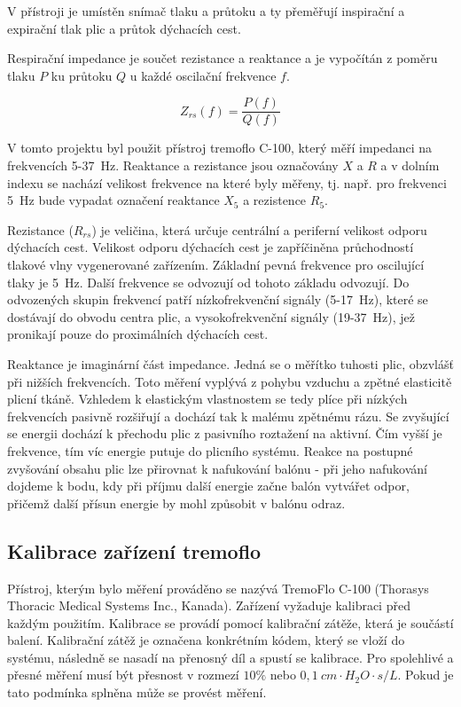 V přístroji je umístěn snímač tlaku a průtoku a ty přeměřují inspirační a expirační tlak plic a průtok dýchacích cest. 

Respirační impedance je součet rezistance a reaktance a je vypočítán z poměru tlaku  $P$ ku průtoku $Q$ u každé oscilační frekvence $f$. \cite{Vlcek2018}

\begin{equation}
	\label{rce:2}
	Z_{rs}(f) = \frac{P(f)}{Q(f)}
\end{equation}


V tomto projektu byl použit přístroj tremoflo C-100, který měří impedanci na frekvencích 5-37~Hz. Reaktance a rezistance jsou označovány $X$ a $R$ a v dolním indexu se nachází velikost frekvence na které byly měřeny, tj. např. pro frekvenci 5~Hz bude vypadat označení reaktance $X_5$ a rezistence $R_5$. 

Rezistance ($R_{rs}$) je veličina, která určuje centrální a periferní velikost odporu dýchacích cest. Velikost odporu dýchacích cest je zapříčiněna průchodností tlakové vlny vygenerované zařízením. Základní pevná frekvence pro oscilující tlaky je 5~Hz. Další frekvence se odvozují od tohoto základu odvozují. Do odvozených skupin frekvencí patří nízkofrekvenční signály (5-17~Hz), které se dostávají do obvodu centra plic, a vysokofrekvenční signály (19-37~Hz), jež pronikají pouze do proximálních dýchacích cest. 

Reaktance je imaginární část impedance. Jedná se o měřítko tuhosti plic, obzvlášť při nižších frekvencích. Toto měření vyplývá z pohybu vzduchu  a zpětné elasticitě plicní tkáně. Vzhledem k elastickým vlastnostem se tedy plíce při nízkých frekvencích pasivně rozšiřují a dochází tak k malému zpětnému rázu. Se zvyšující se energii dochází k přechodu plic z pasivního roztažení na aktivní. Čím vyšší je frekvence, tím víc energie putuje do plicního systému. Reakce na postupné zvyšování obsahu plic lze přirovnat k nafukování balónu - při jeho nafukování dojdeme k bodu, kdy při příjmu další energie začne balón vytvářet odpor, přičemž další přísun energie by mohl způsobit v balónu odraz.


\subsection{Kalibrace zařízení tremoflo}\label{kalibrace}
Přístroj, kterým bylo měření prováděno se nazývá TremoFlo C-100 (Thorasys Thoracic Medical Systems Inc., Kanada). Zařízení vyžaduje kalibraci před každým použitím. Kalibrace se provádí pomocí kalibrační zátěže, která je součástí balení. Kalibrační zátěž je označena konkrétním kódem, který se vloží do systému, následně  se nasadí na přenosný díl a spustí se kalibrace. Pro spolehlivé a přesné měření musí být přesnost 
v rozmezí $10\%$ nebo $0,1~cm \cdot H_{2}O \cdot s/L$. Pokud je tato podmínka splněna může se provést měření. \cite{Vlcek2018}

